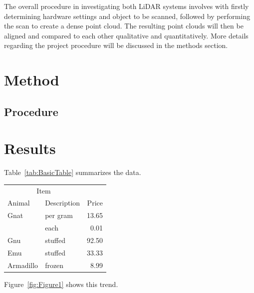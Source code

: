 \documentclass[man]{apa7}
\begin{document}
The overall procedure in investigating both LiDAR systems involves with firstly determining hardware settings and object to be scanned, followed by performing the scan to create a dense point cloud. The resulting point clouds will then be aligned and compared to each other qualitative and quantitatively. More details regarding the project procedure will be discussed in the methods section.



\section{Method}

\subsection{Procedure}


\section{Results}
Table~\ref{tab:BasicTable} summarizes the data. \lipsum[1-3]
\vspace{20pt}

\begin{minipage}{\linewidth}
  \label{tab:BasicTable}
  \begin{tabular}{@{}llr@{}}         \toprule
  \multicolumn{2}{c}{Item}        \\ \cmidrule(r){1-2}
  Animal    & Description & Price \\ \midrule
  Gnat      & per gram    & 13.65 \\
            & each        &  0.01 \\
  Gnu       & stuffed     & 92.50 \\
  Emu       & stuffed     & 33.33 \\
  Armadillo & frozen      &  8.99 \\ \bottomrule
  \end{tabular}
\end{minipage}

\vspace{20pt}

\lipsum[1]

Figure~\ref{fig:Figure1} shows this trend.
\end{document}
